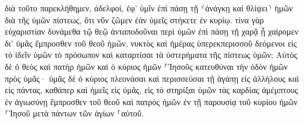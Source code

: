 \documentclass{openreader}
\begin{document}
διὰ τοῦτο παρεκλήθημεν, ἀδελφοί, ἐφ’ ὑμῖν ἐπὶ πάσῃ τῇ ⸂ἀνάγκῃ καὶ θλίψει⸃ ἡμῶν διὰ τῆς ὑμῶν πίστεως, 
ὅτι νῦν ζῶμεν ἐὰν ὑμεῖς στήκετε ἐν κυρίῳ. 
τίνα γὰρ εὐχαριστίαν δυνάμεθα τῷ θεῷ ἀνταποδοῦναι περὶ ὑμῶν ἐπὶ πάσῃ τῇ χαρᾷ ᾗ χαίρομεν δι’ ὑμᾶς ἔμπροσθεν τοῦ θεοῦ ἡμῶν, 
νυκτὸς καὶ ἡμέρας ὑπερεκπερισσοῦ δεόμενοι εἰς τὸ ἰδεῖν ὑμῶν τὸ πρόσωπον καὶ καταρτίσαι τὰ ὑστερήματα τῆς πίστεως ὑμῶν; 
Αὐτὸς δὲ ὁ θεὸς καὶ πατὴρ ἡμῶν καὶ ὁ κύριος ἡμῶν ⸀Ἰησοῦς κατευθύναι τὴν ὁδὸν ἡμῶν πρὸς ὑμᾶς· 
ὑμᾶς δὲ ὁ κύριος πλεονάσαι καὶ περισσεύσαι τῇ ἀγάπῃ εἰς ἀλλήλους καὶ εἰς πάντας, καθάπερ καὶ ἡμεῖς εἰς ὑμᾶς, 
εἰς τὸ στηρίξαι ὑμῶν τὰς καρδίας ἀμέμπτους ἐν ἁγιωσύνῃ ἔμπροσθεν τοῦ θεοῦ καὶ πατρὸς ἡμῶν ἐν τῇ παρουσίᾳ τοῦ κυρίου ἡμῶν ⸀Ἰησοῦ μετὰ πάντων τῶν ἁγίων ⸀αὐτοῦ. 
\end{document}
